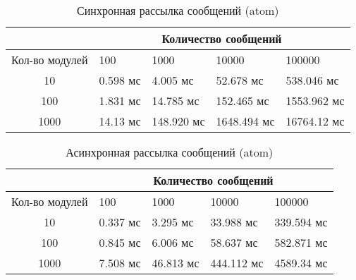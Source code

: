 \begin{table}[htb]
    \caption{\label{tab:atom_rrc_old}Синхронная рассылка сообщений (atom)}
    \begin{center}
        \begin{tabularx}{\textwidth}{|c|X|X|X|X|}
            \hline
            & \multicolumn{4}{|c|}{Количество сообщений} \\
            \hline
            Кол-во модулей & 100   & 1000   & 10000   & 100000   \\
            \hline
            10             & 0.598 мс  & 4.005 мс   & 52.678 мс   & 538.046 мс   \\
            \hline
            100            & 1.831 мс  & 14.785 мс  & 152.465 мс  & 1553.962 мс  \\
            \hline
            1000           & 14.13 мс & 148.920 мс & 1648.494 мс & 16764.12  мс \\
            \hline
        \end{tabularx}
    \end{center}
\end{table}


\begin{table}[htb]
    \caption{\label{tab:atom_rrc}Асинхронная рассылка сообщений (atom)}
    \begin{center}
        \begin{tabularx}{\textwidth}{|c|X|X|X|X|}
            \hline
            & \multicolumn{4}{|c|}{Количество сообщений} \\
            \hline
            Кол-во модулей & 100   & 1000   & 10000   & 100000   \\
            \hline
            10             & 0.337 мс  & 3.295 мс   & 33.988 мс   & 339.594 мс   \\
            \hline
            100            & 0.845 мс  & 6.006 мс  & 58.637 мс  & 582.871 мс  \\
            \hline
            1000           & 7.508 мс & 46.813 мс & 444.112 мс & 4589.34  мс \\
            \hline
        \end{tabularx}
    \end{center}
\end{table}


